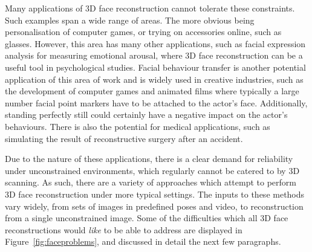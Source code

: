 Many applications of 3D face reconstruction cannot tolerate these
constraints. Such examples span a wide range of areas. The more
obvious being personalisation of computer games, or trying on
accessories online, such as glasses. However, this area has many other
applications, such as facial expression analysis for measuring
emotional arousal, where 3D face reconstruction can be a useful tool
in psychological studies. Facial behaviour transfer is another
potential application of this area of work and is widely used in
creative industries, such as the development of computer games and
animated films where typically a large number facial point markers
have to be attached to the actor's face. Additionally, standing
perfectly still could certainly have a negative impact on the actor's
behaviours. There is also the potential for medical applications,
such as simulating the result of reconstructive surgery after an
accident.

Due to the nature of these applications, there is a clear demand for
reliability under unconstrained environments, which regularly cannot
be catered to by 3D scanning. As such, there are a variety of
approaches which attempt to perform 3D face reconstruction under more
typical settings. The inputs to these methods vary widely, from sets
of images in predefined poses and video, to reconstruction from a
single unconstrained image. Some of the difficulties which all 3D face
reconstructions would \textit{like} to be able to address are
displayed in Figure~\ref{fig:faceproblems}, and discussed in detail
the next few paragraphs.

